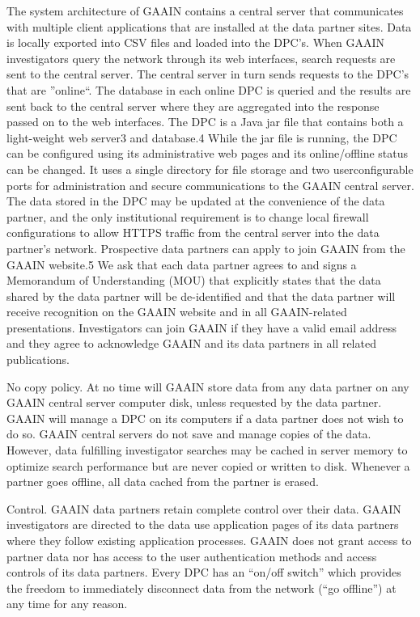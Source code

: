 \cite{gaain}
The system architecture of GAAIN contains a central server that communicates with
multiple client applications that are installed at the
data partner sites. Data is locally exported into CSV
files and loaded into the DPC's. When GAAIN investigators
query the network through its web interfaces, search requests are sent to the central
server.  The central server in turn sends requests to the DPC's that are ''online``.
The database in each online DPC is queried and the results are
sent back to the central server where they are aggregated into the response passed on
to the web interfaces.  The DPC is a Java jar file that contains both a light-weight
web server3 and database.4 While the jar file is running, the DPC can be configured
using its administrative web pages and its online/offline status can be changed. It
uses a single directory for file storage and two userconfigurable ports for
administration and secure communications to the GAAIN central server. The data stored
in the DPC may be updated at the convenience of the data partner, and the only
institutional requirement is to change local firewall configurations to allow HTTPS
traffic from the central server into the data partner's network. Prospective data
partners can apply to join GAAIN from the GAAIN website.5 We ask that each data partner
agrees to and signs a Memorandum of Understanding (MOU) that explicitly states that the
data shared by the data partner will be de-identified and that the data partner will
receive recognition on the GAAIN website and in all GAAIN-related presentations.
Investigators can join GAAIN if they have a valid email address and they agree to
acknowledge GAAIN and its data partners in all related publications.

No copy policy. At no time will GAAIN store data from any data partner on any GAAIN
central server computer disk, unless requested by the data partner. GAAIN will manage a
DPC on its computers if a data partner does not wish to do so. GAAIN central servers do
not save and manage copies of the data. However, data fulfilling investigator searches
may be cached in server memory to optimize search performance but are never copied or
written to disk. Whenever a partner goes offline, all data cached from the partner is
erased.

Control. GAAIN data partners retain complete control over their data.  GAAIN
investigators are directed to the data use application pages of its data partners where
they follow existing application processes.  GAAIN does not grant access to partner
data nor has access to the user authentication methods and access controls of its data
partners. Every DPC has an “on/off switch” which provides the freedom to immediately
disconnect data from the network (“go offline”) at any time for any reason.

